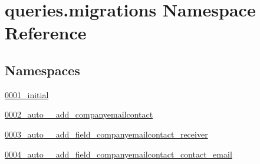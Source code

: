 \hypertarget{namespacequeries_1_1migrations}{\section{queries.\-migrations Namespace Reference}
\label{namespacequeries_1_1migrations}
}
\subsection*{Namespaces}
\begin{DoxyCompactItemize}
\item 
\hyperlink{namespacequeries_1_1migrations_1_10001__initial}{0001\-\_\-initial}
\item 
\hyperlink{namespacequeries_1_1migrations_1_10002__auto____add__companyemailcontact}{0002\-\_\-auto\-\_\-\-\_\-add\-\_\-companyemailcontact}
\item 
\hyperlink{namespacequeries_1_1migrations_1_10003__auto____add__field__companyemailcontact__receiver}{0003\-\_\-auto\-\_\-\-\_\-add\-\_\-field\-\_\-companyemailcontact\-\_\-receiver}
\item 
\hyperlink{namespacequeries_1_1migrations_1_10004__auto____add__field__companyemailcontact__contact__email}{0004\-\_\-auto\-\_\-\-\_\-add\-\_\-field\-\_\-companyemailcontact\-\_\-contact\-\_\-email}
\end{DoxyCompactItemize}

